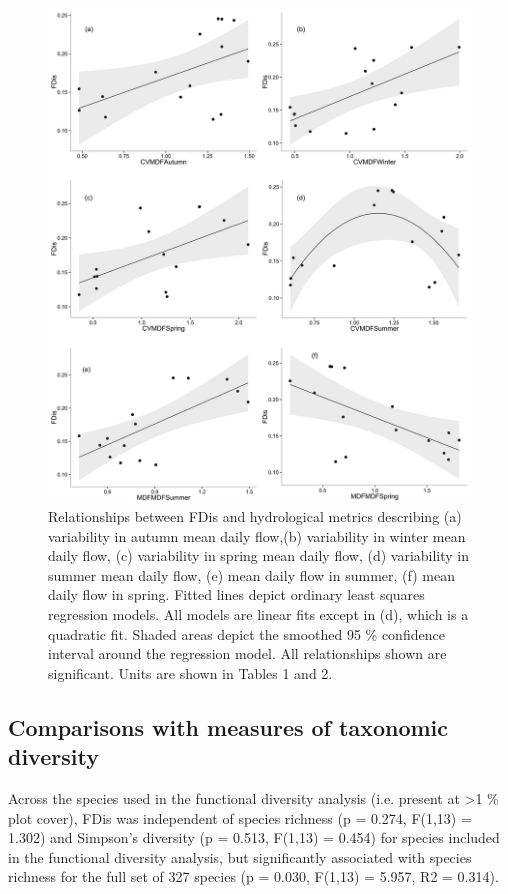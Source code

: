 \documentclass[openright,12pt,a4paper]{memoir}
\begin{document}
\begin{figure}[ht]
\begin{center}
\includegraphics[width=\textwidth,keepaspectratio=true]{fig3.png} %
\caption[Relationships between FDis and hydrological metrics describing variability in seasonal water availability (2).]{\small{Relationships between FDis and hydrological metrics describing (a) variability in autumn mean daily flow,(b) variability in winter mean daily flow, (c) variability in spring mean daily flow, (d) variability in summer mean daily flow, (e) mean daily flow in summer, (f) mean daily flow in spring. Fitted lines depict ordinary least squares regression models. All models are linear fits except in (d), which is a quadratic fit. Shaded areas depict the smoothed 95 \% confidence interval around the regression model.  All relationships shown are significant.  Units are shown in Tables 1 and 2.}}
\label{Ch3_F3} %
\end{center}
\end{figure}   
\clearpage


\subsection{Comparisons with measures of taxonomic diversity}
Across the species used in the functional diversity analysis (i.e. present at >1 \% plot cover), FDis was independent of species richness (p = 0.274, F(1,13) = 1.302) and Simpson’s diversity (p = 0.513, F(1,13) =  0.454) for species included in the functional diversity analysis, but significantly associated with species richness for the full set of 327 species (p = 0.030, F(1,13) = 5.957, R2 = 0.314).
\end{document}
